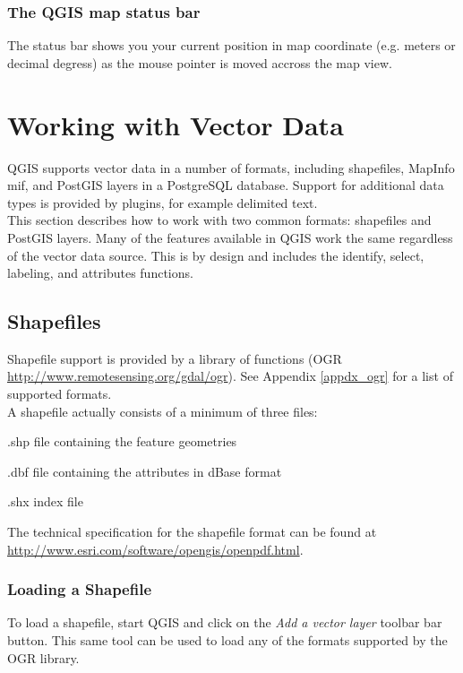 \documentclass[10pt,english]{article}
\begin{document}
\begin{onehalfspace}
\subsubsection{The QGIS map status bar} 
The status bar shows you your current position in map coordinate (e.g. meters
or decimal degress) as the mouse pointer is moved accross the map view.

\section{Working with Vector Data}
QGIS supports vector data in a number of formats, including shapefiles,
MapInfo mif, and PostGIS layers in a PostgreSQL database. Support for
additional data types is provided by plugins, for example delimited text.\\

This section describes how to work with two common formats: shapefiles and
PostGIS layers. Many of the features available in QGIS work the same regardless of the 
vector data source. This is by design and includes the identify, select, labeling, and attributes functions.

\subsection{Shapefiles}
Shapefile support is provided by a library of functions (OGR \url{http://www.remotesensing.org/gdal/ogr}). See Appendix \ref{appdx_ogr} for a list of supported formats.\\

A shapefile actually consists of a minimum of three files:
\begin{compactenum}
\item .shp file containing the feature geometries
\item .dbf file containing the attributes in dBase format
\item .shx index file
\end{compactenum}
The technical specification for the shapefile format can be found at\\ \url{http://www.esri.com/software/opengis/openpdf.html}.
\subsubsection{Loading a Shapefile}
To load a shapefile, start QGIS and click on the \textit{Add a vector layer} toolbar bar button. This same tool can be used to load any of the formats supported by the OGR library.


\end{onehalfspace}
\end{document}
